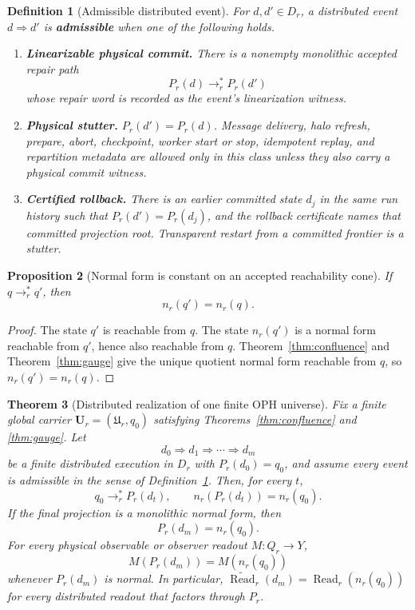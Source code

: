 \documentclass[11pt]{article}
\newtheorem{theorem}{Theorem}[section]
\newtheorem{definition}[theorem]{Definition}
\newtheorem{proposition}[theorem]{Proposition}
\theoremstyle{remark}
\theoremstyle{plain}
\begin{document}
\begin{definition}[Admissible distributed event]\label{def:admissible-distributed-event}
For \(d,d'\in D_r\), a distributed event \(d\Rightarrow d'\) is \textbf{admissible} when one of
the following holds.
\begin{enumerate}[label=(\alph*),leftmargin=2em]
\item \textbf{Linearizable physical commit.} There is a nonempty monolithic accepted repair path
\[
P_r(d)\to_r^*P_r(d')
\]
whose repair word is recorded as the event's linearization witness.
\item \textbf{Physical stutter.} \(P_r(d')=P_r(d)\). Message delivery, halo refresh, prepare,
abort, checkpoint, worker start or stop, idempotent replay, and repartition metadata are allowed
only in this class unless they also carry a physical commit witness.
\item \textbf{Certified rollback.} There is an earlier committed state \(d_j\) in the same run
history such that \(P_r(d')=P_r(d_j)\), and the rollback certificate names that committed
projection root. Transparent restart from a committed frontier is a stutter.
\end{enumerate}
\end{definition}

\begin{proposition}[Normal form is constant on an accepted reachability cone]\label{lem:nf-reachability-cone}
If \(q\to_r^*q'\), then
\[
n_r(q')=n_r(q).
\]
\end{proposition}

\begin{proof}
The state \(q'\) is reachable from \(q\). The state \(n_r(q')\) is a normal form reachable from
\(q'\), hence also reachable from \(q\). Theorem~\ref{thm:confluence} and
Theorem~\ref{thm:gauge} give the unique quotient normal form reachable from \(q\), so
\(n_r(q')=n_r(q)\).
\end{proof}

\begin{theorem}[Distributed realization of one finite OPH universe]\label{thm:distributed-one-universe}
Fix a finite global carrier \(\mathbf U_r=(\mathfrak U_r,q_0)\) satisfying
Theorems~\ref{thm:confluence} and \ref{thm:gauge}. Let
\[
d_0\Rightarrow d_1\Rightarrow\cdots\Rightarrow d_m
\]
be a finite distributed execution in \(D_r\) with \(P_r(d_0)=q_0\), and assume every event is
admissible in the sense of Definition~\ref{def:admissible-distributed-event}. Then, for every
\(t\),
\[
q_0\to_r^*P_r(d_t),
\qquad
n_r(P_r(d_t))=n_r(q_0).
\]
If the final projection is a monolithic normal form, then
\[
P_r(d_m)=n_r(q_0).
\]
For every physical observable or observer readout \(M:Q_r\to Y\),
\[
M(P_r(d_m))=M(n_r(q_0))
\]
whenever \(P_r(d_m)\) is normal. In particular,
\(\widetilde{\operatorname{Read}}_r(d_m)=\operatorname{Read}_r(n_r(q_0))\) for every
distributed readout that factors through \(P_r\).
\end{theorem}
\end{document}
